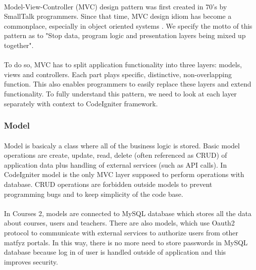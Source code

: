 \paragraph{}
Model-View-Controller (MVC) design pattern was first created in 70's by SmallTalk programmers. Since that time, MVC design idiom has become a commonplace, especially in object oriented systems \cite{mvc}. We specify the motto of this pattern as to "Stop data, program logic and presentation layers being mixed up together".

\paragraph{}
To do so, MVC has to split application functionality into three layers: models, views and controllers. Each part plays specific, distinctive, non-overlapping function. This also enables programmers to easily replace these layers and extend functionality. To fully understand this pattern, we need to look at each layer separately with context to CodeIgniter framework.

\subsubsection{Model}
\paragraph{}
Model is basicaly a class where all of the business logic is stored. Basic model operations are create, update, read, delete (often referenced as CRUD) of application data plus handling of external services (such as API calls). In CodeIgniter model is the only MVC layer supposed to perform operations with database. CRUD operations are forbidden outside models to prevent programming bugs and to keep simplicity of the code base.

\paragraph{}
In Courses 2, models are connected to MySQL database which stores all the data about courses, users and teachers. There are also models, which use Oauth2 protocol to communicate with external services to authorize users from other matfyz portals. In this way, there is no more need to store passwords in MySQL database because log in of user is handled outside of application and this improves security.

